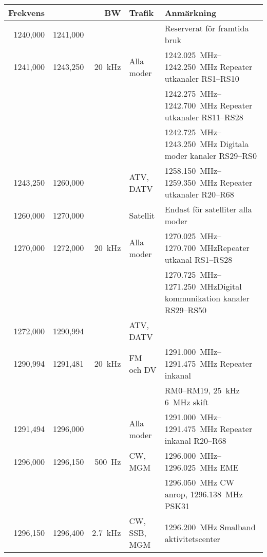 \begin{tabular}{rrrll}
	\textbf{Frekvens} &          & \textbf{BW} & \textbf{Trafik} & \textbf{Anmärkning}          \\ \hline

1240,000 & 1241,000 &         &            & Reserverat för framtida bruk \\ \hline
1241,000 & 1243,250 & \qty{20}{\kilo\hertz} & Alla moder & \SIrange{1242,025}{1242,250}{\mega\hertz} Repeater utkanaler RS1--RS10 \\
	     &          &         &            & \SIrange{1242,275}{1242,700}{\mega\hertz} Repeater utkanaler RS11--RS28\\
	     &          &         &            & \SIrange{1242,725}{1243,250}{\mega\hertz} Digitala moder kanaler RS29--RS0\\ \hline
1243,250 & 1260,000 &         & ATV, DATV  & \SIrange{1258,150}{1259,350}{\mega\hertz} Repeater utkanaler R20--R68\\ \hline
1260,000 & 1270,000 &         & Satellit     & Endast för satelliter alla moder                              \\ \hline
1270,000 & 1272,000 & \qty{20}{\kilo\hertz} & Alla moder   & \SIrange{1270,025}{1270,700}{\mega\hertz}Repeater utkanal  RS1--RS28  \\
	 &          &         &              & \SIrange{1270,725}{1271,250}{\mega\hertz}Digital kommunikation kanaler RS29--RS50\\ \hline
1272,000 & 1290,994 &         & ATV, DATV  &                                         \\ \hline
1290,994 & 1291,481 & \qty{20}{\kilo\hertz}  & FM och DV    & \SIrange{1291,000}{1291,475}{\mega\hertz} Repeater inkanal \\
	 &          &         &              & RM0--RM19, \qty{25}{\kilo\hertz} \qty{6}{\mega\hertz} skift    \\ \hline
1291,494 & 1296,000 &     & Alla moder   & \SIrange{1291,000}{1291,475}{\mega\hertz} Repeater inkanal R20--R68 \\ \hline
1296,000 & 1296,150 & \qty{500}{\hertz}  & CW, MGM     & \SIrange{1296,000}{1296,025}{\mega\hertz} EME \\
	 &          &         &              & \qty{1296,050}{\mega\hertz} CW anrop, \qty{1296,138}{\mega\hertz} PSK31 \\ \hline
1296,150 & 1296,400 & \qty{2,7}{\kilo\hertz} & CW, SSB, MGM & \qty{1296,200}{\mega\hertz} Smalband aktivitetscenter \\ \hline

\end{tabular}
